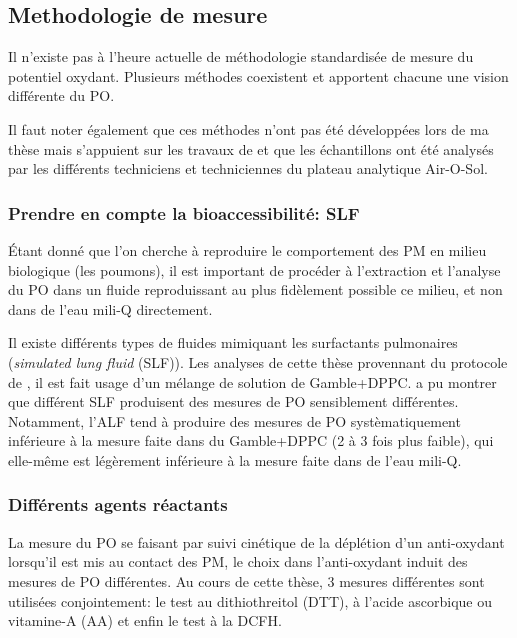 \subsection{Methodologie de mesure}%
\label{sub:methodologie_de_mesure}

Il n'existe pas à l'heure actuelle de méthodologie standardisée de mesure du potentiel
oxydant. Plusieurs méthodes coexistent et apportent chacune une vision différente du PO.

Il faut noter également que ces méthodes n'ont pas été développées lors de ma thèse mais
s'appuient sur les travaux de \textcite{calasPollution2017} et que les échantillons ont été
analysés par les différents techniciens et techniciennes du plateau analytique Air-O-Sol.

\subsubsection{Prendre en compte la bioaccessibilité: SLF}%
\label{sub:prendre_en_compte_la_bioaccessibilite_slf}

Étant donné que l'on cherche à reproduire le comportement des PM en milieu biologique
(les poumons), il est important de procéder à l'extraction et l'analyse du PO dans un
fluide reproduissant au plus fidèlement possible ce milieu, et non dans de l'eau mili-Q
directement.

Il existe différents types de fluides mimiquant les surfactants pulmonaires (\textit{simulated
lung fluid} (SLF)). Les analyses de cette thèse provennant du protocole de
\textcite{calasPollution2017}, il est fait usage d'un mélange de solution de Gamble+DPPC.
\textcite{calasImportance2017} a pu montrer que différent SLF produisent des mesures de PO
sensiblement différentes. Notamment, l'ALF tend à produire des mesures de PO
systèmatiquement inférieure à la mesure faite dans du Gamble+DPPC (2 à 3 fois plus
faible), qui elle-même est légèrement inférieure à la mesure faite dans de l'eau mili-Q.

\subsubsection{Différents agents réactants}%
\label{ssub:differents_agent_reactant}

La mesure du PO se faisant par suivi cinétique de la déplétion d'un anti-oxydant
lorsqu'il est mis au contact des PM, le choix dans l'anti-oxydant induit des mesures de PO
différentes. Au cours de cette thèse, 3 mesures différentes sont utilisées conjointement:
le test au dithiothreitol (DTT), à l'acide ascorbique ou vitamine-A (AA) et enfin le test à
la DCFH.

